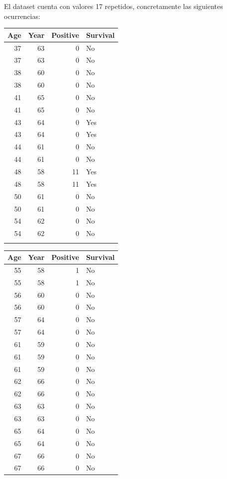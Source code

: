\newpage

El dataset cuenta con valores 17 repetidos, concretamente las siguientes ocurrencias:

\begin{tabular}{r|r|r|l}
\hline
Age & Year & Positive & Survival\\
\hline
37 & 63 & 0 & No\\
\hline
37 & 63 & 0 & No\\
\hline
38 & 60 & 0 & No\\
\hline
38 & 60 & 0 & No\\
\hline
41 & 65 & 0 & No\\
\hline
41 & 65 & 0 & No\\
\hline
43 & 64 & 0 & Yes\\
\hline
43 & 64 & 0 & Yes\\
\hline
44 & 61 & 0 & No\\
\hline
44 & 61 & 0 & No\\
\hline
48 & 58 & 11 & Yes\\
\hline
48 & 58 & 11 & Yes\\
\hline
50 & 61 & 0 & No\\
\hline
50 & 61 & 0 & No\\
\hline
54 & 62 & 0 & No\\
\hline
54 & 62 & 0 & No\\
\hline
& & &\\
\hline
\end{tabular}
\begin{tabular}{r|r|r|l}
\hline
Age & Year & Positive & Survival\\
\hline
55 & 58 & 1 & No\\
\hline
55 & 58 & 1 & No\\
\hline
56 & 60 & 0 & No\\
\hline
56 & 60 & 0 & No\\
\hline
57 & 64 & 0 & No\\
\hline
57 & 64 & 0 & No\\
\hline
61 & 59 & 0 & No\\
\hline
61 & 59 & 0 & No\\
\hline
61 & 59 & 0 & No\\
\hline
62 & 66 & 0 & No\\
\hline
62 & 66 & 0 & No\\
\hline
63 & 63 & 0 & No\\
\hline
63 & 63 & 0 & No\\
\hline
65 & 64 & 0 & No\\
\hline
65 & 64 & 0 & No\\
\hline
67 & 66 & 0 & No\\
\hline
67 & 66 & 0 & No\\
\hline
\end{tabular}

